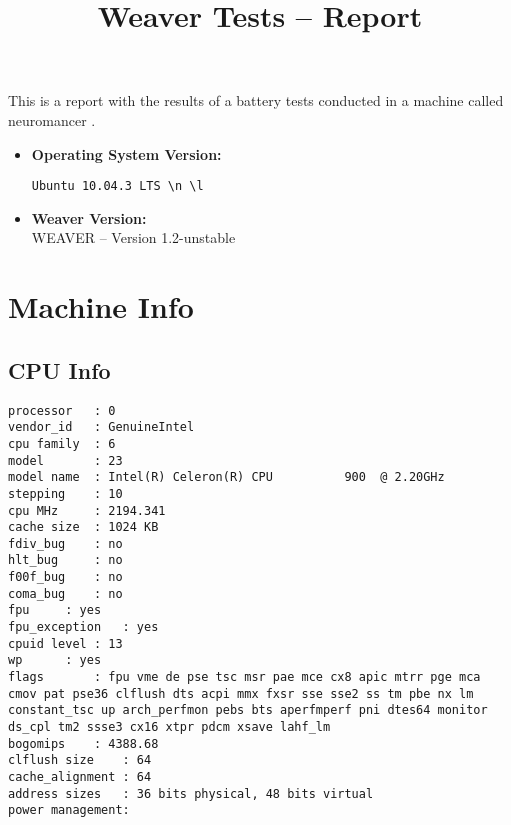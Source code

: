\documentclass{article}
\title{Weaver Tests -- Report}
\begin{document}
\maketitle
This is a report with the results of a battery
tests conducted in a machine called 
neuromancer
.
\begin{itemize}
\item
\textbf{Operating System Version: }
\begin{verbatim}
Ubuntu 10.04.3 LTS \n \l

\end{verbatim}
\item
\textbf{Weaver Version: }\\
WEAVER -- Version 1.2-unstable
\end{itemize}
\section{Machine Info}
\subsection{CPU Info}
\begin{verbatim}
processor	: 0
vendor_id	: GenuineIntel
cpu family	: 6
model		: 23
model name	: Intel(R) Celeron(R) CPU          900  @ 2.20GHz
stepping	: 10
cpu MHz		: 2194.341
cache size	: 1024 KB
fdiv_bug	: no
hlt_bug		: no
f00f_bug	: no
coma_bug	: no
fpu		: yes
fpu_exception	: yes
cpuid level	: 13
wp		: yes
flags		: fpu vme de pse tsc msr pae mce cx8 apic mtrr pge mca cmov pat pse36 clflush dts acpi mmx fxsr sse sse2 ss tm pbe nx lm constant_tsc up arch_perfmon pebs bts aperfmperf pni dtes64 monitor ds_cpl tm2 ssse3 cx16 xtpr pdcm xsave lahf_lm
bogomips	: 4388.68
clflush size	: 64
cache_alignment	: 64
address sizes	: 36 bits physical, 48 bits virtual
power management:

\end{verbatim}
\end{document}
